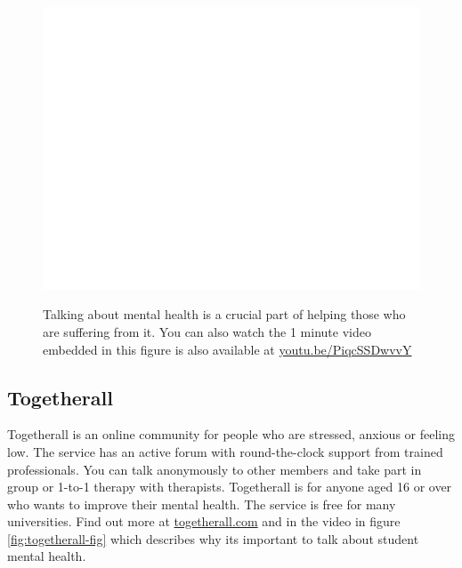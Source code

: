 \documentclass[
]{book}
\begin{document}
\begin{figure}

{\centering \href{https://www.youtube.com/embed/PiqcSSDwvvY}{\includegraphics[width=0.99\linewidth]{cdyf_files/figure-latex/studentminds-fig-1} }

}

\caption{Talking about mental health is a crucial part of helping those who are suffering from it. You can also watch the 1 minute video embedded in this figure is also available at \href{https://youtu.be/PiqcSSDwvvY}{youtu.be/PiqcSSDwvvY} \citep{youtube-student-minds}}\label{fig:studentminds-fig}
\end{figure}



\hypertarget{togetherall}{%
\subsection{Togetherall}\label{togetherall}}

Togetherall is an online community for people who are stressed, anxious or feeling low. The service has an active forum with round-the-clock support from trained professionals. You can talk anonymously to other members and take part in group or 1-to-1 therapy with therapists. Togetherall is for anyone aged 16 or over who wants to improve their mental health. The service is free for many universities. Find out more at \href{https://togetherall.com/}{togetherall.com} and in the video in figure \ref{fig:togetherall-fig} which describes why its important to talk about student mental health.
\end{document}
